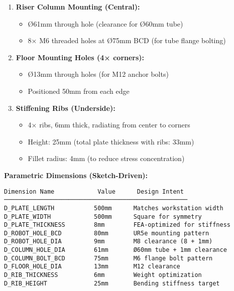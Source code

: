 \documentclass[
]{article}
\providecommand{\tightlist}{%
  \setlength{\itemsep}{0pt}\setlength{\parskip}{0pt}}
\begin{document}
\begin{enumerate}
\def\labelenumi{\arabic{enumi}.}
\setcounter{enumi}{1}
\tightlist
\item
  \textbf{Riser Column Mounting (Central):}

  \begin{itemize}
  \tightlist
  \item
    Ø61mm through hole (clearance for Ø60mm tube)
  \item
    8× M6 threaded holes at Ø75mm BCD (for tube flange bolting)
  \end{itemize}
\item
  \textbf{Floor Mounting Holes (4× corners):}

  \begin{itemize}
  \tightlist
  \item
    Ø13mm through holes (for M12 anchor bolts)
  \item
    Positioned 50mm from each edge
  \end{itemize}
\item
  \textbf{Stiffening Ribs (Underside):}

  \begin{itemize}
  \tightlist
  \item
    4× ribs, 6mm thick, radiating from center to corners
  \item
    Height: 25mm (total plate thickness with ribs: 33mm)
  \item
    Fillet radius: 4mm (to reduce stress concentration)
  \end{itemize}
\end{enumerate}

\textbf{Parametric Dimensions (Sketch-Driven):}

\begin{verbatim}
Dimension Name            Value      Design Intent
───────────────────────────────────────────────────
D_PLATE_LENGTH           500mm      Matches workstation width
D_PLATE_WIDTH            500mm      Square for symmetry
D_PLATE_THICKNESS        8mm        FEA-optimized for stiffness
D_ROBOT_HOLE_BCD         80mm       UR5e mounting pattern
D_ROBOT_HOLE_DIA         9mm        M8 clearance (8 + 1mm)
D_COLUMN_HOLE_DIA        61mm       Ø60mm tube + 1mm clearance
D_COLUMN_BOLT_BCD        75mm       M6 flange bolt pattern
D_FLOOR_HOLE_DIA         13mm       M12 clearance
D_RIB_THICKNESS          6mm        Weight optimization
D_RIB_HEIGHT             25mm       Bending stiffness target
\end{verbatim}
\end{document}
